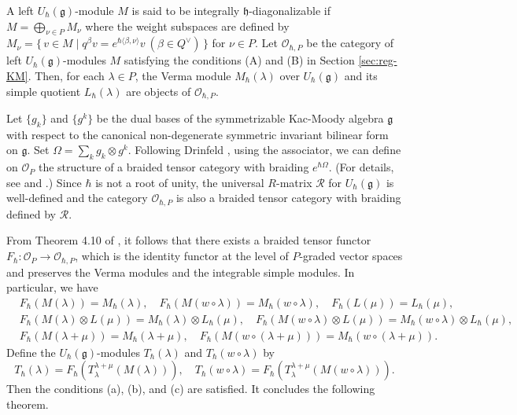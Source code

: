\documentclass[12pt,twoside]{article}
\newcommand\bra{\langle}
\newcommand\ket{\rangle}
\renewcommand\O{{\mathcal O}}
\newcommand\Qv{Q^\vee}
\newcommand\g{{\mathfrak g}}
\newcommand\h{{\mathfrak h}}
\newcommand\intpart{P}
\newcommand\Oint{\O_\intpart}
\newcommand\Ointh{\O_{\hbar,\intpart}}
\theoremstyle{plain} %
\theoremstyle{definition} %
\theoremstyle{definition} %
\numberwithin{theorem}{section}
\numberwithin{equation}{section}
\numberwithin{figure}{section}
\numberwithin{table}{section}
\newcommand\secref[1]{Section \ref{#1}}
\begin{document}
A left $U_\hbar(\g)$-module $M$ is said to be integrally $\h$-diagonalizable 
if $M=\bigoplus_{\nu\in P}M_\nu$ where the weight subspaces are defined 
by $M_\nu=\{\,v\in M\mid q^\beta v=e^{\hbar\bra\beta,\nu\ket}v\ (\beta\in\Qv) \,\}$
for $\nu\in P$.
Let $\Ointh$ be the category of left $U_\hbar(\g)$-modules $M$ satisfying 
the conditions (A) and (B) in \secref{sec:reg-KM}.
Then, for each $\lambda\in P$, the Verma module $M_\hbar(\lambda)$ over $U_\hbar(\g)$ 
and its simple quotient $L_\hbar(\lambda)$ are objects of $\Ointh$.

Let $\{g_k\}$ and $\{g^k\}$ be the dual bases 
of the symmetrizable Kac-Moody algebra $\g$ with respect to 
the canonical non-degenerate symmetric invariant bilinear form on $\g$.
Set $\Omega = \sum_k g_k\otimes g^k$. 
Following Drinfeld \cite{Drinfeld}, using the associator, 
we can define on $\Oint$ the structure of a braided tensor category 
with braiding $e^{\hbar\Omega}$.
(For details, see \cite{Drinfeld} and \cite{EK-I}.)
Since $\hbar$ is not a root of unity, 
the universal $R$-matrix $\mathcal{R}$ for $U_\hbar(\g)$ is well-defined and 
the category $\Ointh$ is also a braided tensor category with 
braiding defined by $\mathcal{R}$.

From Theorem 4.10 of \cite{EK-VI}, it follows that 
there exists a braided tensor functor $F_\hbar:\Oint\to\Ointh$,
which is the identity functor at the level of $P$-graded vector spaces
and preserves the Verma modules and the integrable simple modules.
In particular, we have
\begin{align*}
 &
 F_\hbar(M(\lambda)) = M_\hbar(\lambda), \quad
 F_\hbar(M(w\circ\lambda)) = M_\hbar(w\circ\lambda), \quad
 F_\hbar(L(\mu)) = L_\hbar(\mu),
 \\ &
 F_\hbar(M(\lambda)\otimes L(\mu)) = M_\hbar(\lambda)\otimes L_\hbar(\mu), \quad
 F_\hbar(M(w\circ\lambda)\otimes L(\mu)) = M_\hbar(w\circ\lambda)\otimes L_\hbar(\mu),
 \\ &
 F_\hbar(M(\lambda+\mu)) = M_\hbar(\lambda+\mu), \quad
 F_\hbar(M(w\circ(\lambda+\mu))) = M_\hbar(w\circ(\lambda+\mu)).
\end{align*}
Define the $U_\hbar(\g)$-modules 
$T_\hbar(\lambda)$ and $T_\hbar(w\circ\lambda)$ by
\begin{equation*}
 T_\hbar(\lambda) = F_\hbar(T_\lambda^{\lambda+\mu}(M(\lambda))), \quad
 T_\hbar(w\circ\lambda) = F_\hbar(T_\lambda^{\lambda+\mu}(M(w\circ\lambda))).
\end{equation*}
Then the conditions (a), (b), and (c) are satisfied.
It concludes the following theorem.
\end{document}
